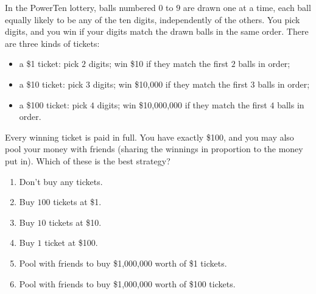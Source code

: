 In the PowerTen lottery, balls numbered $0$ to $9$ are drawn one at a time, each ball equally likely to be any of the ten digits, independently of the others. You pick digits, and you win if your digits match the drawn balls in the same order. There are three kinds of tickets:
\begin{itemize}
\item a \$1 ticket: pick $2$ digits; win \$10 if they match the first $2$ balls in order;
\item a \$10 ticket: pick $3$ digits; win \$10{,}000 if they match the first $3$ balls in order;
\item a \$100 ticket: pick $4$ digits; win \$10{,}000{,}000 if they match the first $4$ balls in order.
\end{itemize}
Every winning ticket is paid in full. You have exactly \$100, and you may also pool your money with friends (sharing the winnings in proportion to the money put in). Which of these is the best strategy?
\begin{enumerate}
\item[(A)] Don't buy any tickets.
\item[(B)] Buy $100$ tickets at \$1.
\item[(C)] Buy $10$ tickets at \$10.
\item[(D)] Buy $1$ ticket at \$100.
\item[(E)] Pool with friends to buy \$1{,}000{,}000 worth of \$1 tickets.
\item[(F)] Pool with friends to buy \$1{,}000{,}000 worth of \$100 tickets.
\end{enumerate}
